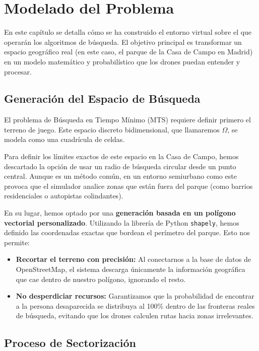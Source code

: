 \chapter{Modelado del Problema}

En este capítulo se detalla cómo se ha construido el entorno virtual sobre el que operarán los algoritmos de búsqueda. El objetivo principal es transformar un espacio geográfico real (en este caso, el parque de la Casa de Campo en Madrid) en un modelo matemático y probabilístico que los drones puedan entender y procesar.

\section{Generación del Espacio de Búsqueda}

El problema de Búsqueda en Tiempo Mínimo (MTS) requiere definir primero el terreno de juego. Este espacio discreto bidimensional, que llamaremos $\Omega$, se modela como una cuadrícula de celdas.

Para definir los límites exactos de este espacio en la Casa de Campo, hemos descartado la opción de usar un radio de búsqueda circular desde un punto central. Aunque es un método común, en un entorno semiurbano como este provoca que el simulador analice zonas que están fuera del parque (como barrios residenciales o autopistas colindantes).

En su lugar, hemos optado por una \textbf{generación basada en un polígono vectorial personalizado}. Utilizando la librería de Python \texttt{shapely}, hemos definido las coordenadas exactas que bordean el perímetro del parque. Esto nos permite:

\begin{itemize}
    \item \textbf{Recortar el terreno con precisión:} Al conectarnos a la base de datos de OpenStreetMap, el sistema descarga únicamente la información geográfica que cae dentro de nuestro polígono, ignorando el resto.
    \item \textbf{No desperdiciar recursos:} Garantizamos que la probabilidad de encontrar a la persona desaparecida se distribuya al 100\% dentro de las fronteras reales de búsqueda, evitando que los drones calculen rutas hacia zonas irrelevantes.
\end{itemize}

\section{Proceso de Sectorización}

